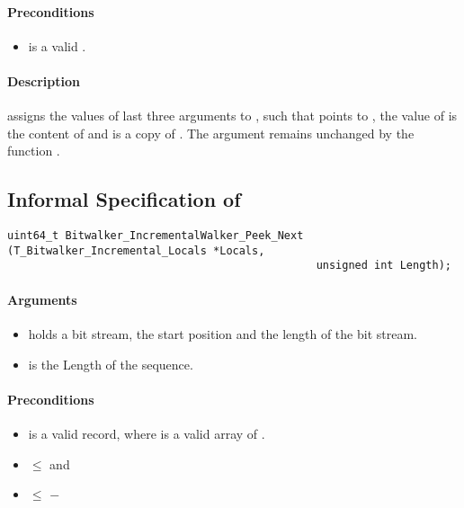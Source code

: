 \paragraph{Preconditions}
\begin{itemize}
    \item  {} is a valid .
\end{itemize}

\paragraph{Description}

\init assigns the values of last three arguments to , such that
 points to , the value of  is the content of  and 
 is a copy of . The argument  remains unchanged by the function \init.

\clearpage

\subsection{Informal Specification of }

\begin{lstlisting}[style=acsl-block]
uint64_t Bitwalker_IncrementalWalker_Peek_Next (T_Bitwalker_Incremental_Locals *Locals,
                                                unsigned int Length);
\end{lstlisting}


\paragraph{Arguments}
\begin{itemize}
    \item  {} holds a bit stream, the start position and the length of the bit stream.
   \item {} is the Length of the sequence.
\end{itemize}

\paragraph{Preconditions}
\begin{itemize}
    \item  {} is a valid record, where  is a valid array of .
    \item {} $\leq$  and
    \item {} $\leq $  $-$ 
\end{itemize}


